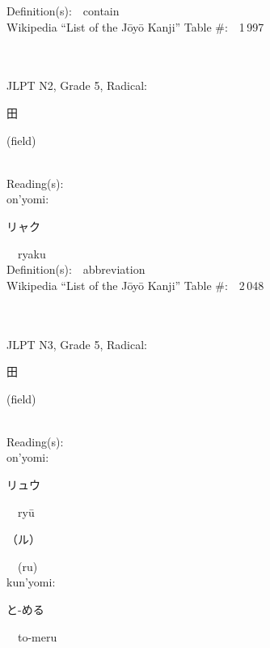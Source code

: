 \begin{multicols}{2}
Definition(s):\ \ contain \\
Wikipedia ``List of the J\=oy\=o Kanji'' Table \#:\ \ 1\,997 \\
\ \ \\
{\fontsize{34pt}{40pt}  }\ \ \\  %
{JLPT N2, Grade 5, Radical:\ \ {\begin{CJK}{UTF8}{min} 田 \end{CJK}} (field) } \\
Reading(s):\ \ \\
{\hspace*{1em}}on'yomi:\ \ \\
{\hspace*{2em}}{\begin{CJK}{UTF8}{min} リャク \end{CJK}}\ \ ryaku\ \ \\
Definition(s):\ \ abbreviation \\
Wikipedia ``List of the J\=oy\=o Kanji'' Table \#:\ \ 2\,048 \\
\ \ \\
{\fontsize{34pt}{40pt}  }\ \ \\  %
{JLPT N3, Grade 5, Radical:\ \ {\begin{CJK}{UTF8}{min} 田 \end{CJK}} (field) } \\
Reading(s):\ \ \\
{\hspace*{1em}}on'yomi:\ \ \\
{\hspace*{2em}}{\begin{CJK}{UTF8}{min} リュウ \end{CJK}}\ \ ry\=u\ \ \\
{\hspace*{2em}}{\begin{CJK}{UTF8}{min} （ル） \end{CJK}}\ \ (ru)\ \ \\
{\hspace*{1em}}kun'yomi:\ \ \\
{\hspace*{2em}}{\begin{CJK}{UTF8}{min} と-める \end{CJK}}\ \ to-meru\ \ \\

\end{multicols}
